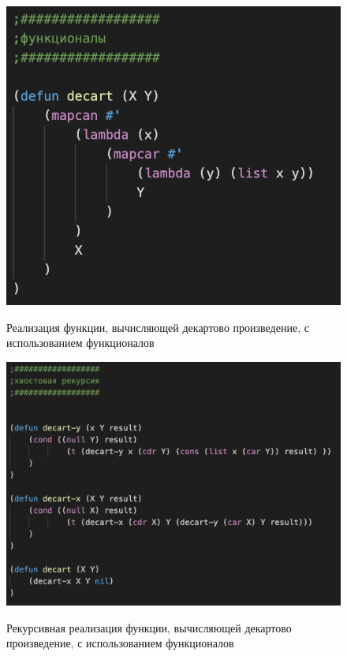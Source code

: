 \documentclass[a4paper,12pt]{article}
\begin{document}
 	\begin{figure}[h!]
 		\begin{center}
 			{\includegraphics[scale = 0.9]{6.5f.png}}
 			\label{ris:6.5f}
 		\end{center}
 	\caption{Реализация функции, вычисляющей декартово произведение, с использованием функционалов}
 	\end{figure}
 
 
  	\begin{figure}[h!]
 	\begin{center}
 		{\includegraphics[scale = 0.7]{6.5r.png}}
 		\label{ris:6.5r}
 	\end{center}
 \caption{Рекурсивная реализация функции, вычисляющей декартово произведение, с использованием функционалов}
 \end{figure}
\end{document}
